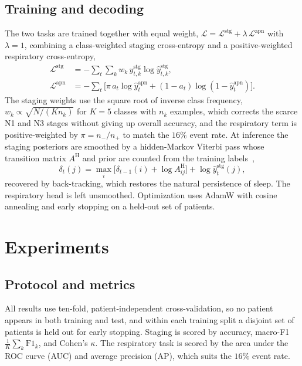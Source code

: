 \documentclass[journal]{IEEEtran}
\begin{document}
\subsection{Training and decoding}
The two tasks are trained together with equal weight, $\mathcal{L}=\mathcal{L}^{\mathrm{stg}}+\lambda\,\mathcal{L}^{\mathrm{apn}}$ with $\lambda=1$, combining a class-weighted staging cross-entropy and a positive-weighted respiratory cross-entropy,
\begin{align}
\mathcal{L}^{\mathrm{stg}}&=-\sum_t\sum_{k}w_k\,y^{\mathrm{stg}}_{t,k}\log\hat y^{\mathrm{stg}}_{t,k},\\
\mathcal{L}^{\mathrm{apn}}&=-\sum_t\big[\pi\,a_t\log\hat y^{\mathrm{apn}}_t+(1-a_t)\log(1-\hat y^{\mathrm{apn}}_t)\big].
\end{align}
The staging weights use the square root of inverse class frequency,
$w_k\propto\sqrt{N/(K n_k)}$ for $K=5$ classes with $n_k$ examples, which corrects the scarce
N1 and N3 stages without giving up overall accuracy, and the respiratory term is
positive-weighted by $\pi=n_-/n_+$ to match the $16\%$ event rate. At inference the staging
posteriors are smoothed by a hidden-Markov Viterbi pass whose transition matrix $A^{\mathrm H}$
and prior are counted from the training labels~\cite{chen2024hmm},
\begin{equation}
\delta_t(j)=\max_i\big[\delta_{t-1}(i)+\log A^{\mathrm H}_{ij}\big]+\log\hat y^{\mathrm{stg}}_t(j),
\end{equation}
recovered by back-tracking, which restores the natural persistence of sleep. The respiratory
head is left unsmoothed. Optimization uses AdamW with cosine annealing and early stopping on a
held-out set of patients.

\section{Experiments}
\label{sec:results}
\subsection{Protocol and metrics}
All results use ten-fold, patient-independent cross-validation, so no patient appears in both
training and test, and within each training split a disjoint set of patients is held out for
early stopping. Staging is scored by accuracy, macro-F1 $\tfrac{1}{K}\sum_k\mathrm{F1}_k$, and
Cohen's $\kappa$. The respiratory task is scored by the area under the ROC curve (AUC) and
average precision (AP), which suits the $16\%$ event rate.
\end{document}
